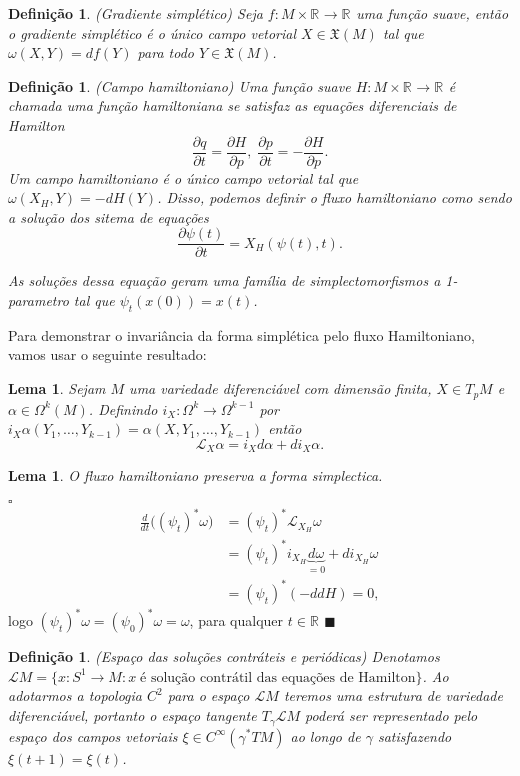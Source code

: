 \documentclass[12pt]{book}
\newtheorem{lema}[teorema]{Lema}
\newtheorem{definicao}[teorema]{Definição}
\newenvironment{prova}[1]{$\square$ #1}{\hfill$\blacksquare$}
\newcommand{\bigparenteses}[1]{\big( #1 \big) }
\newcommand{\circulo}{S^{1}}
\newcommand{\derivadaparcial}[2]{\frac{\partial #1}{\partial #2}}
\newcommand{\liederivada}[1]{\mathcal{L}_{#1}}
\newcommand{\real}[1]{\mathbb{R}^{#1}}
\newcommand{\solucoesperiodicascontrateis}{\mathcal{L}M}
\begin{document}
	\begin{definicao}
		(Gradiente simplético) Seja $f : M \times \real{} \to \real{}$ uma função suave, então o gradiente simplético é o único campo vetorial $X \in \mathfrak{X}(M)$ tal que $\omega(X, Y) = df(Y)$ para todo $Y \in \mathfrak{X}(M)$.
	\end{definicao}
	
	\begin{definicao}
		(Campo hamiltoniano) Uma função suave $H : M \times \real{} \to \real{}$ é chamada uma função hamiltoniana se satisfaz as equações diferenciais de Hamilton
		$$
		\frac{\partial q}{\partial t} = \frac{\partial H}{\partial p}, \; \frac{\partial p}{\partial t} = -\frac{\partial H}{\partial p}. 
		$$
		Um campo hamiltoniano é o único campo vetorial tal que $\omega(X_{H}, Y) = -dH(Y)$. Disso, podemos definir o fluxo hamiltoniano como sendo a solução dos sitema de equações 
		$$
		\label{sisHamilt}
		\derivadaparcial{\psi(t)}{t} = X_{H}(\psi(t), t).
		$$
		
		As soluções dessa equação geram uma família de simplectomorfismos a 1-parametro tal que $\psi_{t}(x(0)) = x(t)$.
	\end{definicao}
	Para demonstrar o invariância da forma simplética pelo fluxo Hamiltoniano, vamos usar o seguinte resultado:
	\begin{lema}
		Sejam $M$ uma variedade diferenciável com dimensão finita, $X \in T_{p}M$ e $\alpha \in \Omega^{k}(M)$. Definindo $i_{X}:\Omega^{k} \to \Omega^{k-1}$ por $i_{X}\alpha(Y_{1}, \dots, Y_{k-1}) = \alpha(X, Y_{1}, \dots, Y_{k-1})$ então
		$$
		\liederivada{X}\alpha = i_{X}d\alpha + di_{X}\alpha.
		$$
	\end{lema}
	\begin{lema}
		O fluxo hamiltoniano preserva a forma simplectica.
	\end{lema}
	\begin{prova}\label{fluxo_convervativo}
			$$
			\begin{aligned}
			\frac{d}{dt}\bigparenteses{(\psi_{t})^{*}\omega} 
			&= (\psi_{t})^{*} \liederivada{X_{H}}\omega  
			\\
			&= (\psi_{t})^{*} i_{X_{H}}\underbrace{d\omega }_ {=0}+ di_{X_{H}}\omega 
			\\
			&= (\psi_{t})^{*} (-ddH)=0,
			\end{aligned}
			$$
			logo $(\psi_{t})^{*} \omega = (\psi_{0})^{*} \omega = \omega$, para qualquer $t \in \real{}$
	\end{prova}
	
	\begin{definicao}\label{definicao_solucoes_periodicas_contratei}
		(Espaço das soluções contráteis e periódicas) Denotamos $\solucoesperiodicascontrateis = \{x:\circulo \to M: x \; \text{é solução contrátil das equações de Hamilton} \}$. Ao adotarmos a topologia $C^{2}$ para o espaço $\solucoesperiodicascontrateis$ teremos uma estrutura de variedade diferenciável, portanto o espaço tangente $T_{\gamma}\solucoesperiodicascontrateis$ poderá ser representado pelo espaço dos campos vetoriais $\xi \in  C^{\infty}(\gamma^{*}TM)$ ao longo de $\gamma$ satisfazendo $\xi(t+1) = \xi(t)$.
	\end{definicao}	
	
\end{document}
